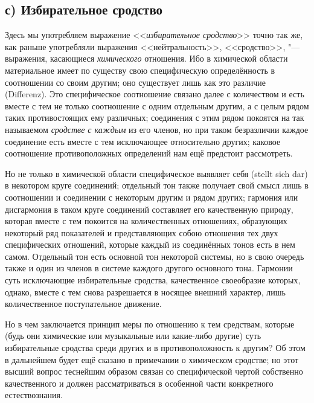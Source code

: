 \subsection[с) Избирательное сродство]{с) Избирательное сродство}

Здесь мы употребляем выражение <<{\em избирательное сродство}>> точно так же,
как раньше употребляли выражения <<нейтральность>>, <<сродство>>, "---
выражения, касающиеся {\em химического} отношения. Ибо в химической области
материальное имеет по существу свою специфическую определённость в соотношении
со своим другим; оно существует лишь как это различие (Diffe\-renz). Это
специфическое соотношение связано далее с количеством и есть вместе с тем не
только соотношение с одним отдельным другим, а с целым рядом таких
противостоящих ему различных; соединения с этим рядом покоятся на так
называемом {\em сродстве с каждым} из его членов, но при таком безразличии
каждое соединение есть вместе с тем исключающее относительно других; каковое
соотношение противоположных определений нам ещё предстоит рассмотреть.

Но не только в химической области специфическое выявляет себя (stellt sich dar)
в некотором круге соединений; отдельный тон также получает свой смысл лишь в
соотношении и соединении с некоторым другим и рядом других; гармония или
дисгармония в таком круге соединений составляет его качественную природу,
которая вместе с тем покоится на количественных отношениях, образующих
некоторый ряд показателей и представляющих собою отношения тех двух
специфических отношений, которые каждый из соединённых тонов есть в нем самом.
Отдельный тон есть основной тон некоторой системы, но в свою очередь также и
один из членов в системе каждого другого основного тона. Гармонии суть
исключающие избирательные сродства, качественное своеобразие которых, однако,
вместе с тем снова разрешается в носящее внешний характер, лишь количественное
поступательное движение.

Но в чем заключается принцип меры по отношению к тем средствам, которые (будь
они химические или музыкальные или какие-либо другие) суть избирательные
сродства среди других и в противоположность к другим? Об этом в дальнейшем
будет ещё сказано в примечании о химическом сродстве; но этот высший вопрос
теснейшим образом связан со специфической чертой собственно качественного и
должен рассматриваться в особенной части конкретного естествознания.


